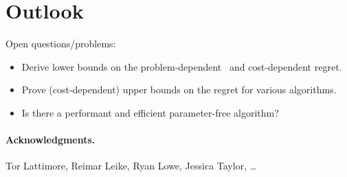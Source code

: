 \documentclass[a4paper]{article}
\begin{document}
\section{Outlook}

Open questions/problems:
\begin{itemize}
\item Derive lower bounds on the problem-dependent~\citep[Thm.~2.2]{Bubeck12}
    and cost-dependent regret.
\item Prove (cost-dependent) upper bounds
    on the regret for various algorithms.
\item Is there a performant and efficient parameter-free algorithm?
\end{itemize}


\paragraph{Acknowledgments.}
Tor Lattimore, Reimar Leike, Ryan Lowe, Jessica Taylor, \dots



\end{document}
